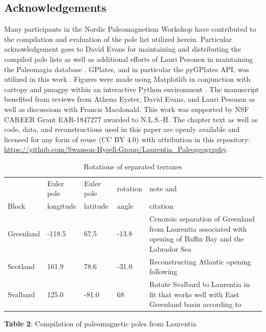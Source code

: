 \documentclass[11pt,letterpaper]{article}
\begin{document}
\subsection*{Acknowledgements}

Many participants in the Nordic Paleomagnetism Workshop have contributed to the compilation and evaluation of the pole list utilized herein. Particular acknowledgement goes to David Evans for maintaining and distributing the compiled pole lists as well as additional efforts of Lauri Pesonen in maintaining the Paleomagia database \citep{Veikkolainen2014a}. GPlates, and in particular the pyGPlates API, was utilized in this work \citep{Muller2018b}. Figures were made using Matplotlib \citep{Hunter2007a} in conjunction with cartopy \citep{Met-Office2010a} and pmagpy \citep{Tauxe2016a} within an interactive Python environment \citep{Perez2007a}. The manuscript benefited from reviews from Athena Eyster, David Evans, and Lauri Pesonen as well as discussions with Francis Macdonald. This work was supported by NSF CAREER Grant EAR-1847277 awarded to N.L.S.-H. The chapter text as well as code, data, and reconstructions used in this paper are openly available and licensed for any form of reuse (CC BY 4.0) with attribution in this repository: \url{https://github.com/Swanson-Hysell-Group/Laurentia_Paleogeography}.


\footnotesize


\begin{table}[hbt]
\caption{Rotations of separated terranes}
{\scriptsize
\begin{tabular}{|l|l|l|l|p{2 in}|}
  \hline
& Euler pole & Euler pole & rotation & note and \\
Block & longitude & latitude & angle & citation \\
\hline
Greenland & -118.5 & 67.5 & -13.8 & Cenozoic separation of Greenland from Laurentia associated with opening of Baffin Bay and the Labrador Sea \citep{Roest1989a} \\
\hline
Scotland & 161.9 & 78.6 & -31.0 & Reconstructing Atlantic opening following \cite{Torsvik2017a} \\
\hline
Svalbard & 125.0 & -81.0 & 68 & Rotate Svalbard to Laurentia in fit that works well with East Greenland basin according to \cite{Maloof2006a}\\
\hline
\end{tabular}
}
\label{tab:terrane_rotations}
\end{table}

\newpage

{\scriptsize
\begin{landscape}
\textbf{Table 2}: Compilation of paleomagnetic poles from Laurentia

\end{landscape}
}
\end{document}
